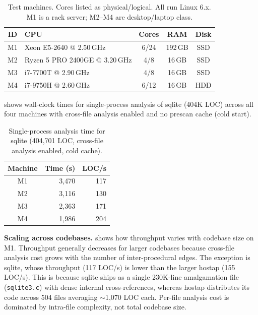 \documentclass[10pt,twocolumn,letterpaper]{article}
\begin{document}
\begin{table}[t]
\centering
\footnotesize
\begin{tabular}{@{}clccc@{}}
\toprule
\textbf{ID} & \textbf{CPU} & \textbf{Cores} & \textbf{RAM} & \textbf{Disk} \\
\midrule
M1 & Xeon E5-2640 @ 2.50\,GHz & 6/24 & 192\,GB & SSD \\
M2 & Ryzen 5 PRO 2400GE @ 3.20\,GHz & 4/8  & 16\,GB  & SSD \\
M3 & i7-7700T @ 2.90\,GHz    & 4/8  & 16\,GB  & SSD \\
M4 & i7-9750H @ 2.60\,GHz    & 6/12 & 16\,GB  & HDD \\
\bottomrule
\end{tabular}
\caption{Test machines.  Cores listed as physical/logical.
All run Linux 6.x.  M1 is a rack server; M2--M4 are desktop/laptop
class.}
\label{tab:testbed}
\end{table}

 shows wall-clock times for single-process analysis
of sqlite (404K LOC) across all four machines with cross-file analysis
enabled and no prescan cache (cold start).

\begin{table}[t]
\centering
\footnotesize
\begin{tabular}{@{}crr@{}}
\toprule
\textbf{Machine} & \textbf{Time (s)} & \textbf{LOC/s} \\
\midrule
M1 & 3{,}470 & 117 \\
M2 & 3{,}116 & 130 \\
M3 & 2{,}363 & 171 \\
M4 & 1{,}986 & 204 \\
\bottomrule
\end{tabular}
\caption{Single-process analysis time for sqlite (404,701 LOC,
cross-file analysis enabled, cold cache).}
\label{tab:runtime}
\end{table}

\textbf{Scaling across codebases.}
 shows how throughput varies with codebase
size on M1.  Throughput generally decreases for larger codebases
because cross-file analysis cost grows with the number of
inter-procedural edges.  The exception is sqlite, whose throughput
(117 LOC/s) is lower than the larger hostap (155 LOC/s).  This is
because sqlite ships as a single 230K-line amalgamation file
(\texttt{sqlite3.c}) with dense internal cross-references, whereas
hostap distributes its code across 504 files averaging $\sim$1{,}070
LOC each.  Per-file analysis cost is dominated by intra-file
complexity, not total codebase size.
\end{document}
